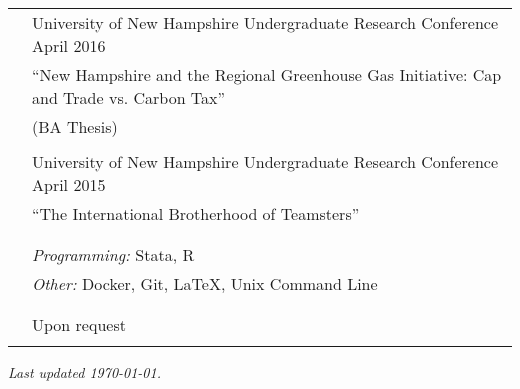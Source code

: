 \documentclass[letterpaper, 11pt]{article}
\begin{document}
\begin{longtable}{p{0.1in}p{5.9in}}
& University of New Hampshire Undergraduate Research Conference \hfill April 2016 \\
& \hspace{10pt} “New Hampshire and the Regional Greenhouse Gas Initiative: Cap and Trade vs. Carbon Tax” \\
& \hspace{10pt} (BA Thesis) \\ & \\

& University of New Hampshire Undergraduate Research Conference \hfill April 2015 \\
& \hspace{10pt} “The International Brotherhood of Teamsters” \\ & \\






{\color{Maroon}{SKILLS}} \\
& \textit{Programming:} \hspace{10pt} Stata, R \\
& \textit{Other:} \hspace{45pt} Docker, Git, LaTeX, Unix Command Line \\ & \\


\multicolumn{2}{l}{{\color{Maroon}{REFERENCES}}} \\
& Upon request \\ & \\


\end{longtable}

\vfill 
\emph{Last updated {\today}.} \\
\end{document}
